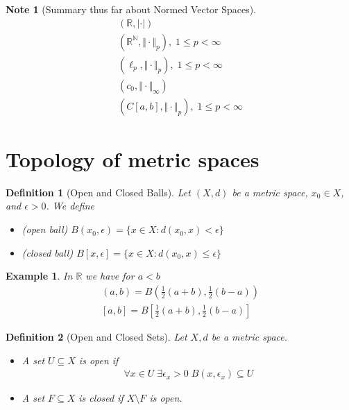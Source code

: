 \documentclass[11pt, oneside]{book}
\theoremstyle{break}
\newtheorem*{note}{Note}
\newtheorem{defn}{Definition}[section]
\newtheorem{eg}{Example}[section]
\newcommand{\bb}[1]{\mathbb{#1}}			%
\begin{document}
\begin{note}[Summary thus far about Normed Vector Spaces]
	\begin{gather*}
		(\bb{R}, |\cdot|) \\
		(\bb{R}^\bb{N}, \Vert \cdot\Vert _p), \; 1 \leq p < \infty \\
		(\ell_p, \Vert \cdot\Vert _p), \; 1 \leq p < \infty \\
		(c_0, \Vert \cdot\Vert _\infty) \\
		(C[a,b], \Vert \cdot\Vert _p), \; 1 \leq p < \infty
	\end{gather*}
\end{note}

\section{Topology of metric spaces}\label{sect:topology of metric spaces}

\begin{defn}[Open and Closed Balls]
	Let $(X, d)$ be a metric space, $x_0 \in X$, and $\epsilon > 0$. We define
	\begin{itemize}
		\item (open ball) $B(x_0, \epsilon) = \{ x \in X : d(x_0, x) < \epsilon \}$ \\
		\item (closed ball) $B[x, \epsilon] = \{ x \in X : d(x_0, x) \leq \epsilon \}$
	\end{itemize}
\end{defn}

\begin{eg}
	In $\bb{R}$ we have for $a < b$
	\begin{gather*}
		(a, b) = B \left( \frac{1}{2} (a + b), \frac{1}{2} (b - a) \right) \\
		[a, b] = B \left[ \frac{1}{2} (a + b), \frac{1}{2} (b - a) \right]
	\end{gather*}
\end{eg}

\begin{defn}[Open and Closed Sets]
	Let ${X, d}$ be a metric space.
	\begin{itemize}
		\item A set $U \subseteq X$ is open if
			\begin{gather}
				\forall x \in U \; \exists \epsilon_x > 0 \; B(x, \epsilon_x) \subseteq U
			\end{gather}

		\item A set $F \subseteq X$ is closed if $X \setminus F$ is open.
	\end{itemize}
\end{defn}
\end{document}
